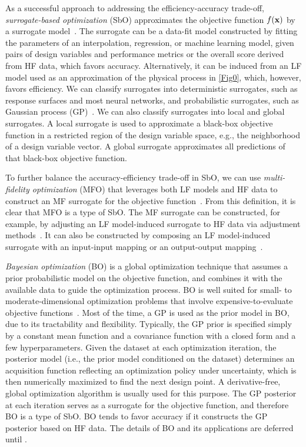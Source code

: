 \documentclass[iicol,sn-basic]{sn-jnl}%
\begin{document}
As a successful approach to addressing the efficiency-accuracy trade-off, \textit{surrogate-based optimization} (SbO) approximates the objective function $f(\bf x)$ by a surrogate model~\citep{Queipo2005,Wang2006,Forrester2008,Simpson2008,Forrester2009}.
The surrogate can be a data-fit model constructed by fitting the parameters of an interpolation, regression, or machine learning model, given pairs of design variables and performance metrics or the overall score derived from HF data, which favors accuracy.
Alternatively, it can be induced from an LF model used as an approximation of the physical process in \cref{Fig0}, which, however, favors efficiency.
We can classify surrogates into deterministic surrogates, such as response surfaces and most neural networks, and probabilistic surrogates, such as Gaussian process (GP)~\citep{Rasmussen2006}.
We can also classify surrogates into local and global surrogates.
A local surrogate is used to approximate a black-box objective function in a restricted region of the design variable space, e.g., the neighborhood of a design variable vector.
A global surrogate approximates all predictions of that black-box objective function.

To further balance the accuracy-efficiency trade-off in SbO, we can use \textit{multi-fidelity optimization} (MFO) that leverages both LF models and HF data to construct an MF surrogate for the objective function~\citep{Alexandrov1998,Huang2006smo,Forrester2007,Viana2014}.
From this definition, it is clear that MFO is a type of SbO.
The MF surrogate can be constructed, for example, by adjusting an LF model-induced surrogate to HF data via adjustment methods~\citep{Kennedy2000,Han2012,Gratiet2014}.
It can also be constructed by composing an LF model-induced surrogate with an input-input mapping or an output-output mapping~\citep{Bandler1994,Bandler2004,Perdikaris2017}.

\textit{Bayesian optimization} (BO) is a global optimization technique that assumes a prior probabilistic model on the objective function, and combines it with the available data to guide the optimization process.
BO is well suited for small- to moderate-dimensional optimization problems that involve expensive-to-evaluate objective functions~\citep{Snoek2012,Shahriari2016,Frazier2018}.
Most of the time, a GP is used as the prior model in BO, due to its tractability and flexibility.
Typically, the GP prior is specified simply by a constant mean function and a covariance function with a closed form and a few hyperparameters.
Given the dataset at each optimization iteration, the posterior model (i.e., the prior model conditioned on the dataset) determines an acquisition function reflecting an optimization policy under uncertainty, which is then numerically maximized to find the next design point.
A derivative-free, global optimization algorithm is usually used for this purpose.
The GP posterior at each iteration serves as a surrogate for the objective function, and therefore BO is a type of SbO.
BO tends to favor accuracy if it constructs the GP posterior based on HF data.
The details of BO and its applications are deferred until .  
\end{document}
